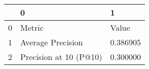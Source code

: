 \begin{tabular}{lll}
\toprule
 & 0 & 1 \\
\midrule
0 & Metric & Value \\
1 & Average Precision & 0.386905 \\
2 & Precision at 10 (P@10) & 0.300000 \\
\bottomrule
\end{tabular}
